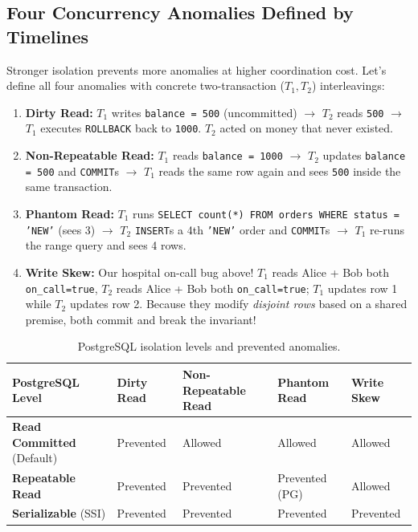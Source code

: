 \subsection{Four Concurrency Anomalies Defined by Timelines}

Stronger isolation prevents more anomalies at higher coordination cost. Let's define all four anomalies with concrete two-transaction ($T_1, T_2$) interleavings:

\begin{enumerate}[leftmargin=15pt]
  \item \textbf{Dirty Read:} $T_1$ writes \texttt{balance = 500} (uncommitted) $\rightarrow$ $T_2$ reads \texttt{500} $\rightarrow$ $T_1$ executes \texttt{ROLLBACK} back to \texttt{1000}. $T_2$ acted on money that never existed.
  \item \textbf{Non-Repeatable Read:} $T_1$ reads \texttt{balance = 1000} $\rightarrow$ $T_2$ updates \texttt{balance = 500} and \texttt{COMMIT}s $\rightarrow$ $T_1$ reads the same row again and sees \texttt{500} inside the same transaction.
  \item \textbf{Phantom Read:} $T_1$ runs \texttt{SELECT count(*) FROM orders WHERE status = 'NEW'} (sees 3) $\rightarrow$ $T_2$ \texttt{INSERT}s a 4th \texttt{'NEW'} order and \texttt{COMMIT}s $\rightarrow$ $T_1$ re-runs the range query and sees 4 rows.
  \item \textbf{Write Skew:} Our hospital on-call bug above! $T_1$ reads Alice + Bob both \texttt{on\_call=true}, $T_2$ reads Alice + Bob both \texttt{on\_call=true}; $T_1$ updates row 1 while $T_2$ updates row 2. Because they modify \emph{disjoint rows} based on a shared premise, both commit and break the invariant!
\end{enumerate}

\begin{table}[htbp]
\centering
\small\sffamily
\begin{tabular}{@{}lllll@{}}
\toprule
\textbf{PostgreSQL Level} & \textbf{Dirty Read} & \textbf{Non-Repeatable Read} & \textbf{Phantom Read} & \textbf{Write Skew} \\ \midrule
\textbf{Read Committed} (Default) & Prevented & Allowed & Allowed & Allowed \\
\textbf{Repeatable Read} & Prevented & Prevented & Prevented (PG) & Allowed \\
\textbf{Serializable} (SSI) & Prevented & Prevented & Prevented & Prevented \\ \bottomrule
\end{tabular}
\caption{PostgreSQL isolation levels and prevented anomalies.}
\label{tab:v1-ch05-isolation}
\end{table}

